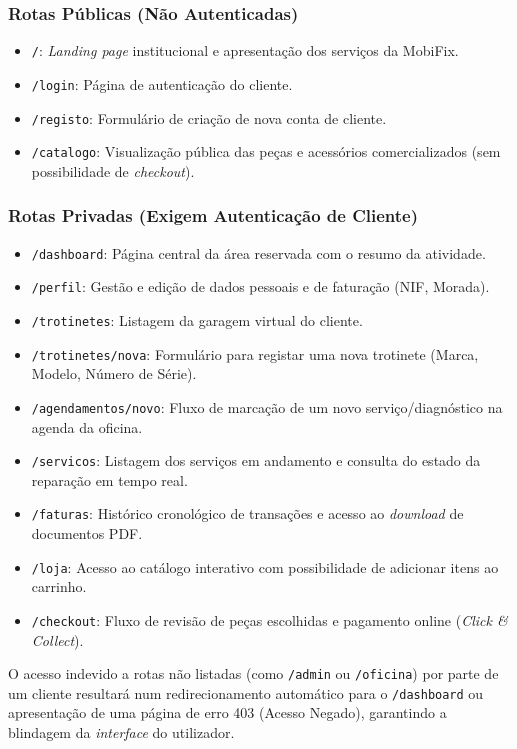 \documentclass[a4paper,12pt]{scrreprt}
\begin{document}
\subsubsection{Rotas Públicas (Não Autenticadas)}
\begin{itemize}
    \item \texttt{/}: \textit{Landing page} institucional e apresentação dos serviços da MobiFix.
    \item \texttt{/login}: Página de autenticação do cliente.
    \item \texttt{/registo}: Formulário de criação de nova conta de cliente.
    \item \texttt{/catalogo}: Visualização pública das peças e acessórios comercializados (sem possibilidade de \textit{checkout}).
\end{itemize}

\subsubsection{Rotas Privadas (Exigem Autenticação de Cliente)}
\begin{itemize}
    \item \texttt{/dashboard}: Página central da área reservada com o resumo da atividade.
    \item \texttt{/perfil}: Gestão e edição de dados pessoais e de faturação (NIF, Morada).
    \item \texttt{/trotinetes}: Listagem da garagem virtual do cliente.
    \item \texttt{/trotinetes/nova}: Formulário para registar uma nova trotinete (Marca, Modelo, Número de Série).
    \item \texttt{/agendamentos/novo}: Fluxo de marcação de um novo serviço/diagnóstico na agenda da oficina.
    \item \texttt{/servicos}: Listagem dos serviços em andamento e consulta do estado da reparação em tempo real.
    \item \texttt{/faturas}: Histórico cronológico de transações e acesso ao \textit{download} de documentos PDF.
    \item \texttt{/loja}: Acesso ao catálogo interativo com possibilidade de adicionar itens ao carrinho.
    \item \texttt{/checkout}: Fluxo de revisão de peças escolhidas e pagamento online (\textit{Click \& Collect}).
\end{itemize}

O acesso indevido a rotas não listadas (como \texttt{/admin} ou \texttt{/oficina}) por parte de um cliente resultará num redirecionamento automático para o \texttt{/dashboard} ou apresentação de uma página de erro 403 (Acesso Negado), garantindo a blindagem da \textit{interface} do utilizador.
\end{document}
